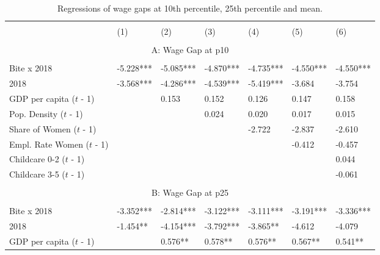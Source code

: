 \documentclass[12pt,draft,a4paper]{article}
\begin{document}
\begin{table}[htbp] %
    \caption{Regressions of wage gaps at 10th percentile, 25th percentile and mean.}
    \begin{adjustbox}{width=\textwidth}
    \begin{tabular}{lllllll}
    \hline & \\[-1.0em]
                              & (1)       & (2)       & (3)       & (4)       & (5)       & (6)       \\ 
    \hline & \\[-1.0em]
    \multicolumn{7}{c}{A: Wage Gap at p10}                                                            \\
    \hline & \\[-1.0em]
    Bite x 2018               & -5.228*** & -5.085*** & -4.870*** & -4.735*** & -4.550*** & -4.550*** \\
    2018                      & -3.568*** & -4.286*** & -4.539*** & -5.419*** & -3.684    & -3.754    \\
    GDP per capita ($t$ - 1)   &           & 0.153     & 0.152     & 0.126     & 0.147     & 0.158     \\
    Pop. Density ($t$ - 1)     &           &           & 0.024     & 0.020     & 0.017     & 0.015     \\
    Share of Women ($t$ - 1)   &           &           &           & -2.722    & -2.837    & -2.610    \\
    Empl. Rate Women ($t$ - 1) &           &           &           &           & -0.412    & -0.457    \\
    Childcare 0-2 ($t$ - 1)    &           &           &           &           &           & 0.044     \\
    Childcare 3-5 ($t$ - 1)    &           &           &           &           &           & -0.061    \\ 
    \hline & \\[-1.0em]
    \multicolumn{7}{c}{B: Wage Gap at p25}                                                            \\ 
    \hline & \\[-1.0em]
    Bite x 2018               & -3.352*** & -2.814*** & -3.122*** & -3.111*** & -3.191*** & -3.336*** \\
    2018                      & -1.454**  & -4.154*** & -3.792*** & -3.865**  & -4.612    & -4.079    \\
    GDP per capita ($t$ - 1)   &           & 0.576**   & 0.578**   & 0.576**   & 0.567**   & 0.541**   \\

\end{tabular}
\end{adjustbox}
\end{table}
\end{document}
